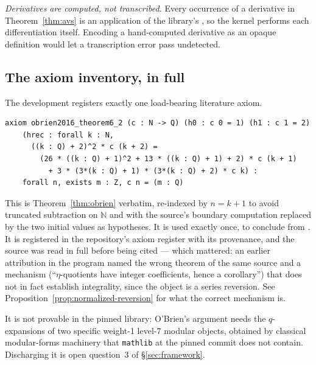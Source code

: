\emph{Derivatives are computed, not transcribed.} Every occurrence of a
derivative in Theorem~\ref{thm:avs} is an application of the library's
, so the kernel performs each differentiation
itself. Encoding a hand-computed derivative as an opaque definition would let
a transcription error pass  undetected.

\subsection{The axiom inventory, in full}\label{subsec:axioms}

The development registers exactly one load-bearing literature axiom.

\begin{center}
\begin{minipage}{0.93\textwidth}
\small
\begin{verbatim}
axiom obrien2016_theorem6_2 (c : N -> Q) (h0 : c 0 = 1) (h1 : c 1 = 2)
    (hrec : forall k : N,
      ((k : Q) + 2)^2 * c (k + 2) =
        (26 * ((k : Q) + 1)^2 + 13 * ((k : Q) + 1) + 2) * c (k + 1)
          + 3 * (3*(k : Q) + 1) * (3*(k : Q) + 2) * c k) :
    forall n, exists m : Z, c n = (m : Q)
\end{verbatim}
\end{minipage}
\end{center}

\noindent
This is Theorem~\ref{thm:obrien} verbatim, re-indexed by $n = k+1$ to avoid
truncated subtraction on $\mathbb{N}$ and with the source's boundary
computation replaced by the two initial values as hypotheses. It is used
exactly once, to conclude  from
. It is registered in the repository's
axiom register with its provenance, and the source was read in full before
being cited --- which mattered: an earlier attribution in the program named
the wrong theorem of the same source and a mechanism (``$\eta$-quotients have
integer coefficients, hence a corollary'') that does not in fact establish
integrality, since the object is a series reversion. See
Proposition~\ref{prop:normalized-reversion} for what the correct mechanism is.

It is not provable in the pinned library: O'Brien's argument needs the
$q$-expansions of two specific weight-1 level-7 modular objects, obtained by
classical modular-forms machinery that \texttt{mathlib} at the pinned commit
does not contain. Discharging it is open question~3 of
\S\ref{sec:framework}.

